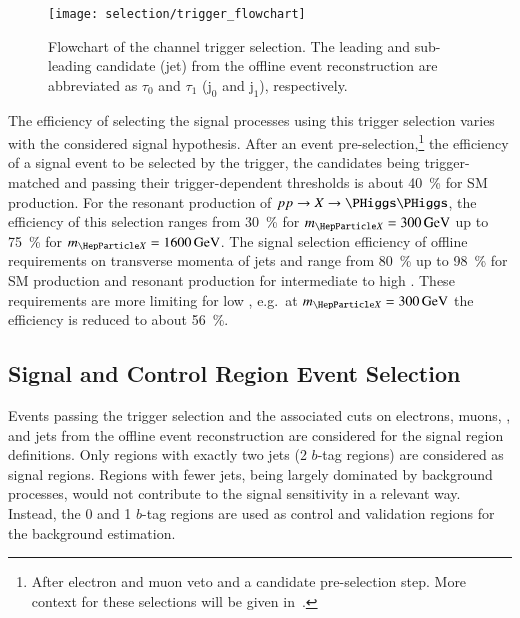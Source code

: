 \begin{figure}[htbp]
  \centering

  \texttt{[image: selection/trigger\_flowchart]}

  \caption{Flowchart of the \hadhad channel trigger selection. The
    leading and sub-leading \tauhadvis candidate (jet) from the
    offline event reconstruction are abbreviated as $\tau_0$ and
    $\tau_1$ ($\text{j}_0$ and $\text{j}_1$), respectively.}%
  \label{fig:trigger_selection_flowchart}
\end{figure}

The efficiency of selecting the signal processes using this trigger
selection varies with the considered signal hypothesis. After an event
pre-selection,\footnote{After electron and muon veto and a \tauhadvis
  candidate pre-selection step. More context for these selections will
  be given in~.} the efficiency of a signal event to
be selected by the trigger, the \tauhadvis candidates being
trigger-matched and passing their trigger-dependent \pT thresholds is
about \SI{40}{\percent} for SM \HH production. For the resonant
production of $pp \to X \to \HH$, the efficiency of this selection
ranges from \SI{30}{\percent} for $\mX = \SI{300}{\GeV}$ up to
\SI{75}{\percent} for $\mX = \SI{1600}{\GeV}$. The signal selection
efficiency of offline requirements on transverse momenta of jets and
\dRtautau range from \SI{80}{\percent} up to \SI{98}{\percent} for SM
\HH production and resonant production for intermediate to high
\mX. These requirements are more limiting for low \mX, e.g.\ at
$\mX = \SI{300}{\GeV}$ the efficiency is reduced to about
\SI{56}{\percent}.





\subsection{Signal and Control Region Event Selection}%
\label{sec:sr_and_cr_selection}

Events passing the trigger selection and the associated cuts on
electrons, muons, \tauhadvis, and jets from the offline event
reconstruction are considered for the signal region definitions.  Only
regions with exactly two \btagged jets (2 $b$-tag regions) are
considered as signal regions. Regions with fewer \btagged jets, being
largely dominated by background processes, would not contribute to the
signal sensitivity in a relevant way. Instead, the 0 and 1 $b$-tag
regions are used as control and validation regions for the background
estimation.

